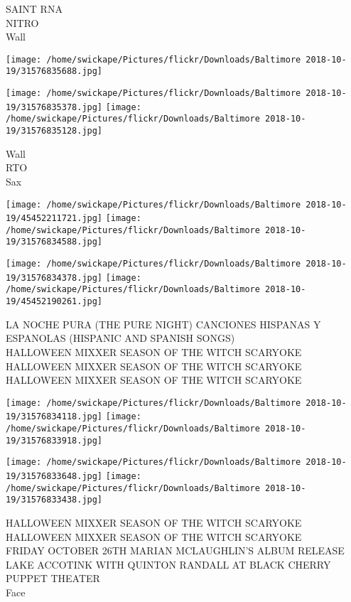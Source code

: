 \documentclass[10pt,letterpaper]{article}
\begin{document}
SAINT RNA\\
NITRO\\
Wall
\pagebreak

\texttt{[image: /home/swickape/Pictures/flickr/Downloads/Baltimore 2018-10-19/31576835688.jpg]}

\vspace{0.25in}
\texttt{[image: /home/swickape/Pictures/flickr/Downloads/Baltimore 2018-10-19/31576835378.jpg]}
\texttt{[image: /home/swickape/Pictures/flickr/Downloads/Baltimore 2018-10-19/31576835128.jpg]}

Wall\\
RTO\\
Sax
\pagebreak

\texttt{[image: /home/swickape/Pictures/flickr/Downloads/Baltimore 2018-10-19/45452211721.jpg]}
\texttt{[image: /home/swickape/Pictures/flickr/Downloads/Baltimore 2018-10-19/31576834588.jpg]}

\texttt{[image: /home/swickape/Pictures/flickr/Downloads/Baltimore 2018-10-19/31576834378.jpg]}
\texttt{[image: /home/swickape/Pictures/flickr/Downloads/Baltimore 2018-10-19/45452190261.jpg]}

LA NOCHE PURA (THE PURE NIGHT) CANCIONES HISPANAS Y ESPANOLAS (HISPANIC AND SPANISH SONGS)\\
HALLOWEEN MIXXER SEASON OF THE WITCH SCARYOKE\\
HALLOWEEN MIXXER SEASON OF THE WITCH SCARYOKE\\
HALLOWEEN MIXXER SEASON OF THE WITCH SCARYOKE
\pagebreak

\texttt{[image: /home/swickape/Pictures/flickr/Downloads/Baltimore 2018-10-19/31576834118.jpg]}
\texttt{[image: /home/swickape/Pictures/flickr/Downloads/Baltimore 2018-10-19/31576833918.jpg]}

\texttt{[image: /home/swickape/Pictures/flickr/Downloads/Baltimore 2018-10-19/31576833648.jpg]}
\texttt{[image: /home/swickape/Pictures/flickr/Downloads/Baltimore 2018-10-19/31576833438.jpg]}

HALLOWEEN MIXXER SEASON OF THE WITCH SCARYOKE\\
HALLOWEEN MIXXER SEASON OF THE WITCH SCARYOKE\\
FRIDAY OCTOBER 26TH MARIAN MCLAUGHLIN'S ALBUM RELEASE LAKE ACCOTINK WITH QUINTON RANDALL AT BLACK CHERRY PUPPET THEATER\\
Face
\pagebreak
\end{document}
